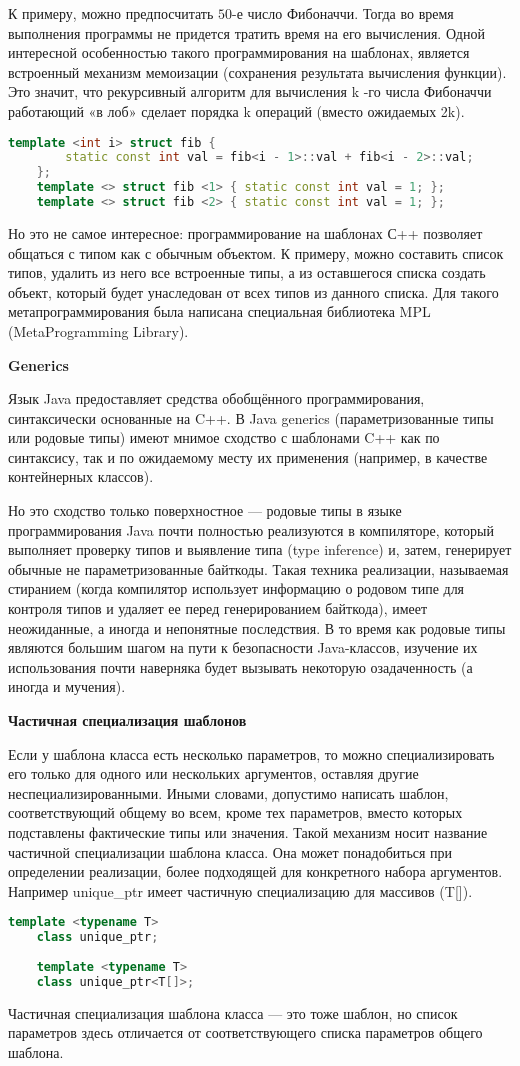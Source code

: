 \documentclass{article}
\begin{document}
К примеру, можно предпосчитать $50$-е число Фибоначчи. Тогда во время выполнения программы не придется тратить время на его вычисления. Одной интересной особенностью такого программирования на шаблонах, является встроенный механизм мемоизации (сохранения результата вычисления функции). Это значит, что рекурсивный алгоритм для вычисления k -го числа Фибоначчи работающий «в лоб» сделает порядка k операций (вместо ожидаемых 2k).

\begin{lstlisting}[language=C++]
	template <int i> struct fib { 
		static const int val = fib<i - 1>::val + fib<i - 2>::val;
	};
	template <> struct fib <1> { static const int val = 1; };
	template <> struct fib <2> { static const int val = 1; };
\end{lstlisting}

Но это не самое интересное: программирование на шаблонах С++ позволяет общаться с типом как с обычным объектом. К примеру, можно составить список типов, удалить из него все встроенные типы, а
из оставшегося списка создать объект, который будет унаследован от всех типов из данного списка. Для такого метапрограммирования была написана специальная библиотека MPL (MetaProgramming Library).

\textbf{Generics}

Язык Java предоставляет средства обобщённого программирования, синтаксически основанные на C++. В Java generics (параметризованные типы или родовые типы) имеют мнимое сходство с шаблонами C++ как
по синтаксису, так и по ожидаемому месту их применения (например, в качестве контейнерных классов).

Но это сходство только поверхностное — родовые типы в языке программирования Java почти полностью реализуются в компиляторе, который выполняет проверку типов и выявление типа (type inference)
и, затем, генерирует обычные не параметризованные байткоды. Такая техника реализации, называемая стиранием (когда компилятор использует информацию о родовом типе для контроля типов и удаляет ее перед генерированием байткода), имеет неожиданные, а иногда и непонятные последствия. В то время как родовые типы являются большим шагом на пути к безопасности Java-классов, изучение их использования почти наверняка будет вызывать некоторую озадаченность (а иногда и мучения).

\textbf{Частичная специализация шаблонов}

Если у шаблона класса есть несколько параметров, то можно специализировать его только для одного или нескольких аргументов, оставляя другие неспециализированными. Иными словами, допустимо написать шаблон, соответствующий общему во всем, кроме тех параметров, вместо которых подставлены фактические типы или значения. Такой механизм носит название частичной специализации шаблона класса. Она может понадобиться при определении реализации, более подходящей для конкретного набора аргументов. Например unique\_ptr имеет частичную специализацию для массивов (T[]).

\begin{lstlisting}[language=C++]
	template <typename T>
	class unique_ptr;
	
	template <typename T>
	class unique_ptr<T[]>;
\end{lstlisting}
Частичная специализация шаблона класса — это тоже шаблон, но список параметров здесь отличается от соответствующего списка параметров общего шаблона.
\end{document}
